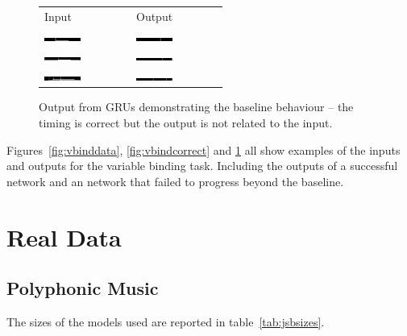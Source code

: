 \begin{figure}
\centering
	\begin{tabu} to \textwidth {XX}
		Input & Output \\
		\includegraphics[width=0.45\textwidth, interpolate=false]{exps/vbind/100x1gruinput} & 
		\includegraphics[width=0.45\textwidth, interpolate=false]{exps/vbind/100x1gruoutput} \\
		\includegraphics[width=0.45\textwidth, interpolate=false]{exps/vbind/100x2gruinput} & 
		\includegraphics[width=0.45\textwidth, interpolate=false]{exps/vbind/100x2gruoutput} \\
		\includegraphics[width=0.45\textwidth, interpolate=false]{exps/vbind/100x3gruinput} & 
		\includegraphics[width=0.45\textwidth, interpolate=false]{exps/vbind/100x3gruoutput} \\
	\end{tabu}
	\caption[Example of baseline for variable binding]{Output from GRUs demonstrating the baseline
	behaviour -- the timing is correct but the output is not related to the input.}
	\label{fig:vbindfail}
\end{figure}

Figures~\ref{fig:vbinddata}, \ref{fig:vbindcorrect} and \ref{fig:vbindfail} all show examples of
the inputs and outputs for the variable binding task. Including the outputs of a successful network
and an network that failed to progress beyond the baseline.

\section{Real Data}

\subsection{Polyphonic Music}
The sizes of the models used are reported in table~\ref{tab:jsbsizes}.


